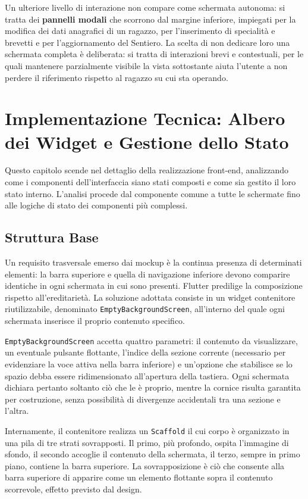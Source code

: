 \documentclass[11pt]{article}
\numberwithin{figure}{section}
\begin{document}
Un ulteriore livello di interazione non compare come schermata autonoma: si tratta dei \textbf{pannelli modali} che scorrono dal margine inferiore, impiegati per la modifica dei dati anagrafici di un ragazzo, per l'inserimento di specialità e brevetti e per l'aggiornamento del Sentiero. La scelta di non dedicare loro una schermata completa è deliberata: si tratta di interazioni brevi e contestuali, per le quali mantenere parzialmente visibile la vista sottostante aiuta l'utente a non perdere il riferimento rispetto al ragazzo su cui sta operando.

\section{Implementazione Tecnica: Albero dei Widget e Gestione dello Stato}

Questo capitolo scende nel dettaglio della realizzazione front-end, analizzando come i componenti dell'interfaccia siano stati composti e come sia gestito il loro stato interno. L'analisi procede dal componente comune a tutte le schermate fino alle logiche di stato dei componenti più complessi.

\subsection{Struttura Base}

Un requisito trasversale emerso dai mockup è la continua presenza di determinati elementi: la barra superiore e quella di navigazione inferiore devono comparire identiche in ogni schermata in cui sono presenti. Flutter predilige la composizione rispetto all'ereditarietà. La soluzione adottata consiste in un widget contenitore riutilizzabile, denominato \texttt{EmptyBackgroundScreen}, all'interno del quale ogni schermata inserisce il proprio contenuto specifico.

\texttt{EmptyBackgroundScreen} accetta quattro parametri: il contenuto da visualizzare, un eventuale pulsante flottante, l'indice della sezione corrente (necessario per evidenziare la voce attiva nella barra inferiore) e un'opzione che stabilisce se lo spazio debba essere ridimensionato all'apertura della tastiera. Ogni schermata dichiara pertanto soltanto ciò che le è proprio, mentre la cornice risulta garantita per costruzione, senza possibilità di divergenze accidentali tra una sezione e l'altra.

Internamente, il contenitore realizza un \texttt{Scaffold} il cui corpo è organizzato in una pila di tre strati sovrapposti. Il primo, più profondo, ospita l'immagine di sfondo, il secondo accoglie il contenuto della schermata, il terzo, sempre in primo piano, contiene la barra superiore. La sovrapposizione è ciò che consente alla barra superiore di apparire come un elemento flottante sopra il contenuto scorrevole, effetto previsto dal design.
\end{document}

